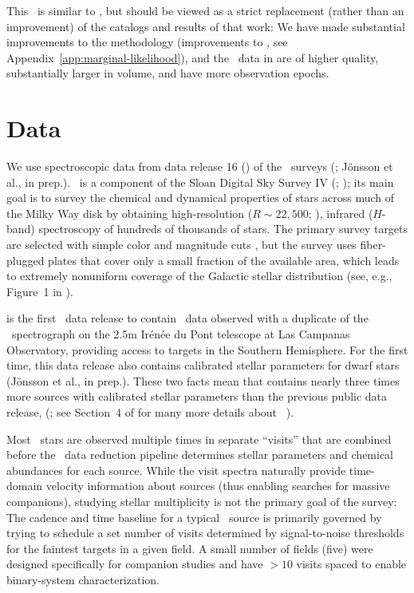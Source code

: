 \documentclass[modern]{aastex63}
\begin{document}
This \documentname\ is similar to \cite{Price-Whelan:2018}, but should be viewed
as a strict replacement (rather than an improvement) of the catalogs and results
of that work: We have made substantial improvements to the methodology
(improvements to \thejoker, see Appendix~\ref{app:marginal-likelihood}), and the
\apogee\ data in  are of higher quality, substantially larger in
volume, and have more observation epochs.

\section{Data} \label{sec:data}

We use spectroscopic data from data release 16 () of the \apogee\ surveys
(\citealt{Majewski:2017, DR16}; J\"onsson et al., in prep.).
\apogee\ is a component of the Sloan Digital Sky Survey IV (\sdssiv;
\citealt{Gunn:2006, Blanton:2017}); its main goal is to survey the chemical
and dynamical properties of stars across much of the Milky Way disk by obtaining
high-resolution ($R \sim 22,500$; \citealt{Wilson:2019}), infrared ($H$-band)
spectroscopy of hundreds of thousands of stars.
The primary survey targets are selected with simple color and magnitude cuts
\citep{Zasowski:2013, Zasowski:2017}, but the survey uses fiber-plugged plates
that cover only a small fraction of the available area, which leads to extremely
nonuniform coverage of the Galactic stellar distribution (see, e.g., Figure~1 in
\citealt{DR16}).

 is the first \sdss\ data release to contain \apogee\ data observed with
a duplicate of the \apogee\ spectrograph on the 2.5m Ir\'en\'ee du Pont
telescope \citep{Bowen:1973} at Las Campanas Observatory, providing access to
targets in the Southern Hemisphere.
For the first time, this data release also contains calibrated stellar
parameters for dwarf stars (J\"onsson et al., in prep.).
These two facts mean that  contains nearly three times more sources with
calibrated stellar parameters than the previous public data release, 
(\citealt{Abolfathi:2017, Holtzman:2018}; see Section~4 of \citealt{DR16} for
many more details about \apogee\ ).

Most \apogee\ stars are observed multiple times in separate ``visits'' that are
combined before the \apogee\ data reduction pipeline \citep{Nidever:2015,
Zamora:2015, ASPCAP} determines stellar parameters and chemical abundances for
each source.
While the visit spectra naturally provide time-domain velocity information about
sources (thus enabling searches for massive companions), studying stellar
multiplicity is not the primary goal of the survey:
The cadence and time baseline for a typical \apogee\ source is primarily
governed by trying to schedule a set number of visits determined by
signal-to-noise thresholds for the faintest targets in a given field.
A small number of fields (five) were designed specifically for companion studies
and have $>10$ visits spaced to enable binary-system characterization.
\end{document}

